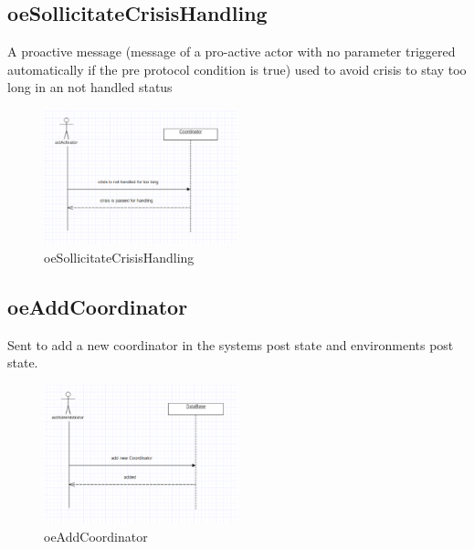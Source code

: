 \subsection{oeSollicitateCrisisHandling}
A proactive message (message of a pro-active actor with no parameter triggered
automatically if the pre protocol condition is true) used to avoid crisis to
stay too long in an not handled status
\begin{figure}[H]
\begin{center}
\includegraphics[width=0.5\textwidth]{./images/oeSollicitateCrisisHandling.eps} 
\end{center}
\caption{oeSollicitateCrisisHandling}
\end{figure}


\subsection{oeAddCoordinator}
Sent to add a new coordinator in the systems post state and environments post
state.
\begin{figure}[H]
\begin{center}
\includegraphics[width=0.5\textwidth]{./images/oeAddCoordinator.eps} 
\end{center}
\caption{oeAddCoordinator}
\end{figure}


